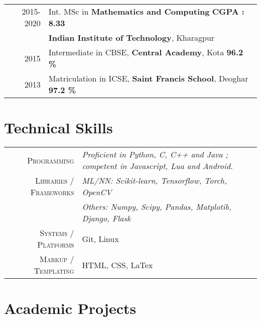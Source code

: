 \documentclass[a4paper,10pt]{extarticle} %
\begin{document}
\begin{tabular}{r|p{18cm}}	
2015-2020 & Int. MSc in \textbf{Mathematics and Computing} \hfill{\textbf{CGPA : 8.33}}\\
&\textbf{Indian Institute of Technology}, Kharagpur\\
2015 & Intermediate in CBSE, \textbf{Central Academy}, Kota  \hfill{\textbf{96.2 \%}}\\
2013 & Matriculation in ICSE, \textbf{Saint Francis School}, Deoghar  \hfill{\textbf{97.2 \%}}
\end{tabular}


\section{Technical Skills}

\begin{tabular}{r|p{18cm}}
\textsc{Programming} & \itshape{Proficient in} Python, C, C++ and Java ; \itshape{competent in} Javascript, Lua and Android. \\
\textsc{Libraries / Frameworks} & \itshape{ML/NN: }Scikit-learn, Tensorflow, Torch, OpenCV\\
& \itshape{Others: }Numpy, Scipy, Pandas, Matplotib, Django, Flask\\
\textsc{Systems / Platforms} & Git, Linux\\
\textsc{Markup / Templating} & HTML, CSS, LaTex
\end{tabular}


\section{Academic Projects}
\end{document}
